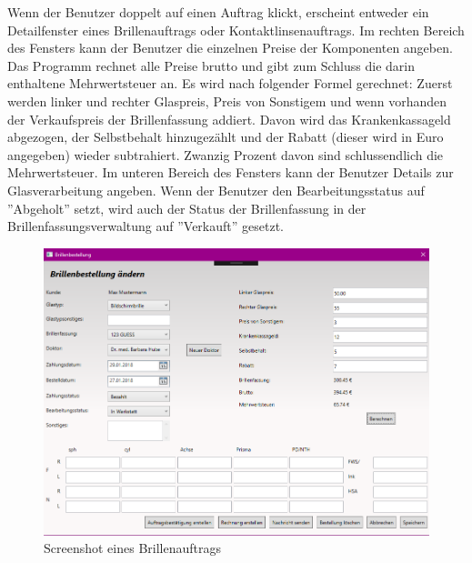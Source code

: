 Wenn der Benutzer doppelt auf einen Auftrag klickt, erscheint entweder ein Detailfenster eines Brillenauftrags oder Kontaktlinsenauftrags. Im rechten Bereich des Fensters kann der Benutzer die einzelnen Preise der Komponenten angeben. Das Programm rechnet alle Preise  brutto und gibt zum Schluss die darin enthaltene Mehrwertsteuer an. Es wird nach folgender Formel gerechnet: Zuerst werden linker und rechter Glaspreis, Preis von Sonstigem und wenn vorhanden der Verkaufspreis der Brillenfassung addiert. Davon wird das Krankenkassageld abgezogen, der Selbstbehalt hinzugezählt und der Rabatt (dieser wird in Euro angegeben) wieder subtrahiert. Zwanzig Prozent davon sind schlussendlich die Mehrwertsteuer. 
Im unteren Bereich des Fensters kann der Benutzer Details zur Glasverarbeitung angeben. Wenn der Benutzer den Bearbeitungsstatus auf ''Abgeholt'' setzt, wird auch der Status der Brillenfassung in der Brillenfassungsverwaltung auf ''Verkauft'' gesetzt.
\begin{figure}[H]
\begin{center}
	\includegraphics[scale=.25]{images/Brillenauftrag.png}
\end{center}
	\caption{Screenshot eines Brillenauftrags}
	\label{fig:sample}
\end{figure}
